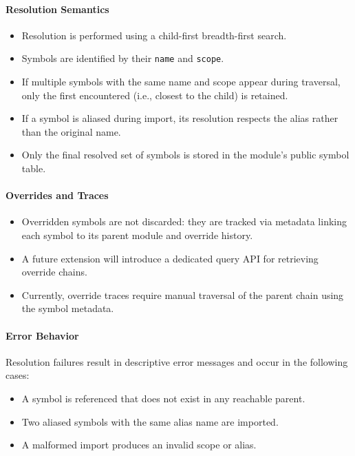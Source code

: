 \documentclass[sigplan,screen]{acmart}
\begin{document}
\paragraph{Resolution Semantics}
\begin{itemize}
  \item Resolution is performed using a child-first breadth-first search.
  \item Symbols are identified by their \texttt{name} and \texttt{scope}.
  \item If multiple symbols with the same name and scope appear during traversal, only the first encountered (i.e., closest to the child) is retained.
  \item If a symbol is aliased during import, its resolution respects the alias rather than the original name.
  \item Only the final resolved set of symbols is stored in the module's public symbol table.
\end{itemize}

\paragraph{Overrides and Traces}
\begin{itemize}
  \item Overridden symbols are not discarded: they are tracked via metadata linking each symbol to its parent module and override history.
  \item A future extension will introduce a dedicated query API for retrieving override chains.
  \item Currently, override traces require manual traversal of the parent chain using the symbol metadata.
\end{itemize}

\paragraph{Error Behavior}
Resolution failures result in descriptive error messages and occur in the following cases:
\begin{itemize}
  \item A symbol is referenced that does not exist in any reachable parent.
  \item Two aliased symbols with the same alias name are imported.
  \item A malformed import produces an invalid scope or alias.
\end{itemize}
\end{document}
